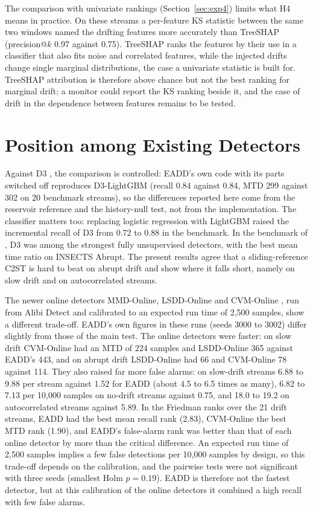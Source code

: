 The comparison with univariate rankings (Section~\ref{sec:exp4}) limits what H4 means in practice. On these streams a per-feature KS statistic between the same two windows named the drifting features more accurately than TreeSHAP (precision@$k$ 0.97 against 0.75). TreeSHAP ranks the features by their use in a classifier that also fits noise and correlated features, while the injected drifts change single marginal distributions, the case a univariate statistic is built for. TreeSHAP attribution is therefore above chance but not the best ranking for marginal drift; a monitor could report the KS ranking beside it, and the case of drift in the dependence between features remains to be tested.

\section{Position among Existing Detectors}
\label{sec:disc-position}

Against D3 \citep{Gozuacik2019}, the comparison is controlled: EADD's own code with its parts switched off reproduces D3-LightGBM (recall 0.84 against 0.84, MTD 299 against 302 on 20 benchmark streams), so the differences reported here come from the reservoir reference and the history-null test, not from the implementation. The classifier matters too: replacing logistic regression with LightGBM raised the incremental recall of D3 from 0.72 to 0.88 in the benchmark. In the benchmark of \citet{Lukats2024}, D3 was among the strongest fully unsupervised detectors, with the best mean time ratio on INSECTS Abrupt. The present results agree that a sliding-reference C2ST is hard to beat on abrupt drift and show where it falls short, namely on slow drift and on autocorrelated streams.

The newer online detectors MMD-Online, LSDD-Online \citep{CobbSequential2022} and CVM-Online \citep{RossAdams2012}, run from Alibi Detect \citep{AlibiDetect} and calibrated to an expected run time of 2,500 samples, show a different trade-off. EADD's own figures in these runs (seeds 3000 to 3002) differ slightly from those of the main test. The online detectors were faster: on slow drift CVM-Online had an MTD of 224 samples and LSDD-Online 365 against EADD's 443, and on abrupt drift LSDD-Online had 66 and CVM-Online 78 against 114. They also raised far more false alarms: on slow-drift streams 6.88 to 9.88 per stream against 1.52 for EADD (about 4.5 to 6.5 times as many), 6.82 to 7.13 per 10,000 samples on no-drift streams against 0.75, and 18.0 to 19.2 on autocorrelated streams against 5.89. In the Friedman ranks over the 21 drift streams, EADD had the best mean recall rank (2.83), CVM-Online the best MTD rank (1.90), and EADD's false-alarm rank was better than that of each online detector by more than the critical difference. An expected run time of 2,500 samples implies a few false detections per 10,000 samples by design, so this trade-off depends on the calibration, and the pairwise tests were not significant with three seeds (smallest Holm $p = 0.19$). EADD is therefore not the fastest detector, but at this calibration of the online detectors it combined a high recall with few false alarms.

